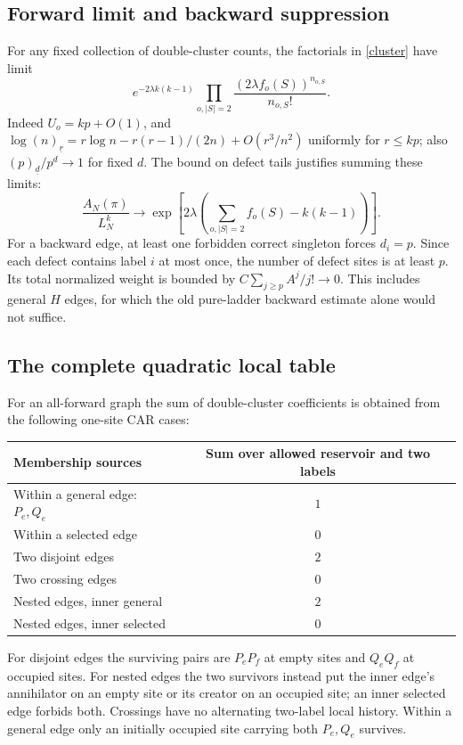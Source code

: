 \documentclass[11pt]{article}
\newcommand{\fall}[2]{(#1)_{\underline{#2}}}
\begin{document}
\subsection*{Forward limit and backward suppression}
For any fixed collection of double-cluster counts, the factorials
in \eqref{cluster} have limit
\begin{equation}
 e^{-2\lambda k(k-1)}
 \prod_{o,|S|=2}\frac{(2\lambda f_o(S))^{n_{o,S}}}{n_{o,S}!}.
\end{equation}
Indeed $U_o=kp+O(1)$, and
$\log\fall n r=r\log n-r(r-1)/(2n)+O(r^3/n^2)$ uniformly
for $r\le kp$; also $\fall p d/p^d\to1$ for fixed $d$.
The bound on defect tails justifies summing these limits:
\begin{equation}\label{forward}
 \frac{A_N(\pi)}{L_N^k}\longrightarrow
 \exp\left[2\lambda\left(
       \sum_{o,|S|=2}f_o(S)-k(k-1)\right)\right].
\end{equation}
For a backward edge, at least one forbidden correct singleton
forces $d_i=p$. Since each defect contains label $i$ at most once,
the number of defect sites is at least $p$. Its total normalized
weight is bounded by $C\sum_{j\ge p}A^j/j!\to0$.
This includes general $H$ edges, for which the old pure-ladder
backward estimate alone would not suffice.

\subsection*{The complete quadratic local table}
For an all-forward graph the sum of double-cluster coefficients
is obtained from the following one-site CAR cases:
\begin{center}
\begin{tabular}{lc}
\toprule
Membership sources & Sum over allowed reservoir and two labels\\
\midrule
Within a general edge: $P_e,Q_e$ & $1$\\
Within a selected edge & $0$\\
Two disjoint edges & $2$\\
Two crossing edges & $0$\\
Nested edges, inner general & $2$\\
Nested edges, inner selected & $0$\\
\bottomrule
\end{tabular}
\end{center}
For disjoint edges the surviving pairs are $P_eP_f$ at empty
sites and $Q_eQ_f$ at occupied sites. For nested edges the two
survivors instead put the inner edge's annihilator on an empty
site or its creator on an occupied site; an inner selected edge
forbids both. Crossings have no alternating two-label local
history. Within a general edge only an initially occupied
site carrying both $P_e,Q_e$ survives.
\end{document}
